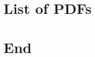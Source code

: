 \documentclass[10pt,letterpaper]{article}
\title{\MyTitle}
\author{\MyAuthor}
\date{\MyDate}
\begin{document}
\maketitle

\renewcommand{\labelitemii}{$\square$} %
\renewcommand{\labelitemiii}{$\ast$}  %

\pagestyle{empty}


\setcounter{secnumdepth}{0}
\tableofcontents
\newpage

\section{List of PDFs}

\listpdfs

\newpage

\section{\FirstSectionName}





\section{End}
\end{document}
